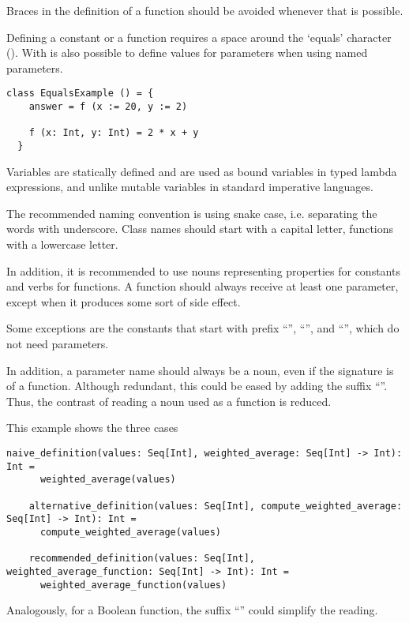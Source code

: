 Braces in the definition of a function should be avoided whenever that is possible.

Defining a constant or a function requires a space around the `equals' character (\sdef).
With \sdefparam is also possible to define values for parameters when using named parameters.

\begin{lstlisting}[label={lst:exampleFunctionWithoutBraces}]
  class EqualsExample () = {
    answer = f (x := 20, y := 2)

    f (x: Int, y: Int) = 2 * x + y
  }
\end{lstlisting}


Variables are statically defined and are used as bound variables in typed lambda expressions, and unlike mutable variables in standard imperative languages.

The recommended naming convention is using snake case, i.e. separating the words with underscore.
Class names should start with a capital letter, functions with a lowercase letter.

In addition, it is recommended to use nouns representing properties for constants and verbs for functions.
A function should always receive at least one parameter, except when it produces some sort of side effect.

Some exceptions are the constants that start with prefix ``'', ``'', and ``'', which do not need parameters.

In addition, a parameter name should always be a noun, even if the signature is of a function.
Although redundant, this could be eased by adding the suffix ``''.
Thus, the contrast of reading a noun used as a function is reduced.

This example shows the three cases

\begin{lstlisting}[label={lst:exampleFunctionsAsParameter}]
    naive_definition(values: Seq[Int], weighted_average: Seq[Int] -> Int): Int =
      weighted_average(values)

    alternative_definition(values: Seq[Int], compute_weighted_average: Seq[Int] -> Int): Int =
      compute_weighted_average(values)

    recommended_definition(values: Seq[Int], weighted_average_function: Seq[Int] -> Int): Int =
      weighted_average_function(values)
\end{lstlisting}

Analogously, for a Boolean function, the suffix ``'' could simplify the reading.


